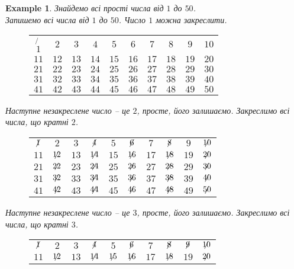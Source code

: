 \documentclass[a4paper, 14pt]{extarticle}
\theoremstyle{theoremdd}
\theoremstyle{theoremdd}
\theoremstyle{theoremdd}
\theoremstyle{theoremdd}
\newtheorem{example}[theorem]{Example}
\theoremstyle{theoremdd}
\theoremstyle{theoremdd}
\theoremstyle{theoremdd}
\theoremstyle{theoremdd}
\begin{document}
\begin{example}
Знайдемо всі прості числа від $1$ до $50$.\\
Запишемо всі числа від $1$ до $50$. Число $1$ можна закреслити.
\begin{figure}[H]
\centering
\begin{tabular}{cccccccccc}
$\not{1}$ & $2$ & $3$ & $4$ & $5$ & $6$ & $7$ & $8$ & $9$ & $10$ \\
$11$ & $12$ & $13$ & $14$ & $15$ & $16$ & $17$ & $18$ & $19$ & $20$ \\
$21$ & $22$ & $23$ & $24$ & $25$ & $26$ & $27$ & $28$ & $29$ & $30$ \\
$31$ & $32$ & $33$ & $34$ & $35$ & $36$ & $37$ & $38$ & $39$ & $40$ \\
$41$ & $42$ & $43$ & $44$ & $45$ & $46$ & $47$ & $48$ & $49$ & $50$
\end{tabular}
\end{figure}
Наступне незакреслене число -- це $2$, просте, його залишаємо. Закреслимо всі числа, що кратні $2$.
\begin{figure}[H]
\centering
\begin{tabular}{cccccccccc}
$\centernot{1}$ & $2$ & $3$ & $\centernot{4}$ & $5$ & $\centernot{6}$ & $7$ & $\centernot{8}$ & $9$ & $\centernot{10}$ \\
$11$ & $\centernot{12}$ & $13$ & $\centernot{14}$ & $15$ & $\centernot{16}$ & $17$ & $\centernot{18}$ & $19$ & $\centernot{20}$ \\
$21$ & $\centernot{22}$ & $23$ & $\centernot{24}$ & $25$ & $\centernot{26}$ & $27$ & $\centernot{28}$ & $29$ & $\centernot{30}$ \\
$31$ & $\centernot{32}$ & $33$ & $\centernot{34}$ & $35$ & $\centernot{36}$ & $37$ & $\centernot{38}$ & $39$ & $\centernot{40}$ \\
$41$ & $\centernot{42}$ & $43$ & $\centernot{44}$ & $45$ & $\centernot{46}$ & $47$ & $\centernot{48}$ & $49$ & $\centernot{50}$
\end{tabular}
\end{figure}
Наступне незакреслене число -- це $3$, просте, його залишаємо. Закреслимо всі числа, що кратні $3$.
\begin{figure}[H]
\centering
\begin{tabular}{cccccccccc}
$\centernot{1}$ & $2$ & $3$ & $\centernot{4}$ & $5$ & $\centernot{6}$ & $7$ & $\centernot{8}$ & $\centernot{9}$ & $\centernot{10}$ \\
$11$ & $\centernot{12}$ & $13$ & $\centernot{14}$ & $\centernot{15}$ & $\centernot{16}$ & $17$ & $\centernot{18}$ & $19$ & $\centernot{20}$ \\

\end{tabular}
\end{figure}
\end{example}
\end{document}
